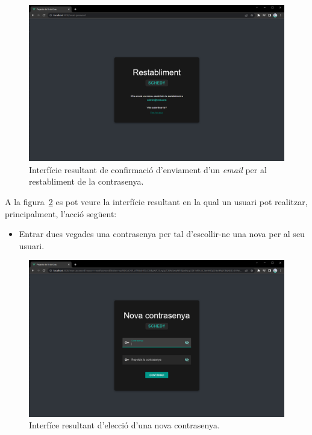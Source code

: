 \documentclass[a4paper,12pt]{ThesisStyle}
\begin{document}
\begin{figure}[H]
  \centering
  \includegraphics[width=\textwidth]{assets/results/auth/restablerta.png}
  \caption{\label{img:resultats_auth_restablerta}Interfície resultant de confirmació d'enviament d'un \textit{email} per al restabliment de la contrasenya.}
\end{figure}

\newpage

A la figura~\ref{img:resultats_auth_novaContrasenya} es pot veure la interfície resultant en la qual un usuari pot realitzar, principalment, l'acció següent:
\begin{itemize}
  \item Entrar dues vegades una contrasenya per tal d'escollir-ne una nova per al seu usuari.
\end{itemize}

\begin{figure}[H]
  \centering
  \includegraphics[width=\textwidth]{assets/results/auth/novaContrasenya.png}
  \caption{\label{img:resultats_auth_novaContrasenya}Interfíce resultant d'elecció d'una nova contrasenya.}
\end{figure}
\end{document}
